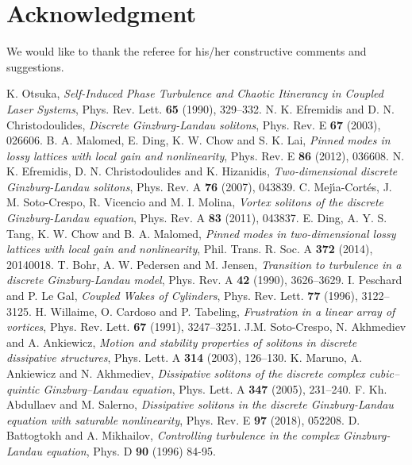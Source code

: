 \documentclass[preprintnumbers,amsmath,amssymb]{revtex4}
\begin{document}
\section*{Acknowledgment}
We would like to thank the referee for his/her constructive comments and suggestions. 
%
\begin{thebibliography}{99}
%
 K. Otsuka, {\em Self-Induced Phase Turbulence and Chaotic Itinerancy in Coupled Laser Systems}, Phys. Rev. Lett. \textbf{65} (1990), 329--332.
%	
 N. K. Efremidis and D. N. Christodoulides, {\em Discrete Ginzburg-Landau solitons}, Phys. Rev. E \textbf{67}  (2003), 026606.
%
 B. A. Malomed, E. Ding, K. W. Chow and S. K. Lai, {\em Pinned modes in lossy lattices with local gain and nonlinearity}, Phys. Rev. E \textbf{86} (2012), 036608.
%
 N. K. Efremidis,  D. N. Christodoulides and K. Hizanidis, {\em Two-dimensional discrete Ginzburg-Landau solitons}, Phys. Rev. A \textbf{76} (2007), 043839.
%
 C. Mej\'{\i}a-Cort\'{e}s, J. M. Soto-Crespo, R. Vicencio and M. I. Molina, {\em Vortex solitons of the discrete Ginzburg-Landau equation}, Phys. Rev. A \textbf{83} (2011), 043837.
%
 E. Ding, A. Y. S. Tang, K. W. Chow
and B. A. Malomed, {\em Pinned modes in
two-dimensional lossy lattices with local gain and nonlinearity}, Phil. Trans. R. Soc. A \textbf{372} (2014), 20140018.
%
 T. Bohr, A. W. Pedersen and M. Jensen, {\em Transition to turbulence in a discrete Ginzburg-Landau model}, Phys. Rev. A \textbf{42} (1990), 3626--3629.
%
 I. Peschard and P. Le Gal, {\em Coupled Wakes of Cylinders}, Phys. Rev. Lett. \textbf{77} (1996), 3122--3125.
%
 H. Willaime, O. Cardoso and P. Tabeling, {\em Frustration in a linear array of vortices}, Phys. Rev. Lett. \textbf{67}  (1991), 3247--3251.
%
 J.M. Soto-Crespo, N. Akhmediev and A. Ankiewicz, {\em Motion and stability properties of solitons in discrete dissipative structures}, Phys. Lett. A \textbf{314} (2003), 126--130.	
%
 K. Maruno, A. Ankiewicz and N. Akhmediev, {\em Dissipative solitons of the discrete complex cubic–quintic
Ginzburg–Landau equation}, Phys. Lett. A \textbf{347} (2005), 231--240.
%
 F. Kh. Abdullaev and M. Salerno, {\em Dissipative solitons in the discrete Ginzburg-Landau equation with saturable nonlinearity}, Phys. Rev. E \textbf{97} (2018), 052208.
%
 D. Battogtokh and A. Mikhailov, {\em Controlling turbulence in the complex Ginzburg-Landau equation}, Phys. D \textbf{90} (1996) 84-95.
%

\end{thebibliography}
\end{document}

